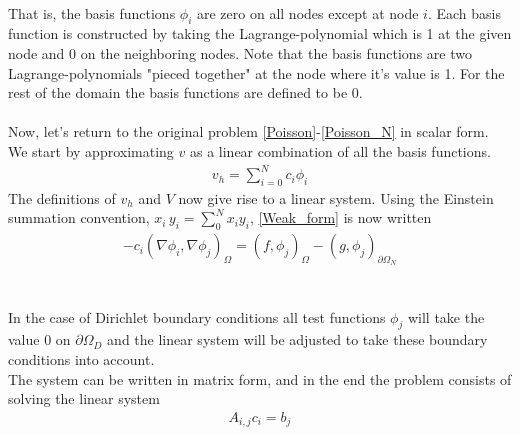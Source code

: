 \\
That is, the basis functions $\phi_i$ are zero on all nodes except at node $i$. Each basis function is constructed by taking the Lagrange-polynomial which is 1 at the given node and 0 on the neighboring nodes. Note that the basis functions are two Lagrange-polynomials "pieced together" at the node where it's value is 1. For the rest of the domain the basis functions are defined to be 0. \\ \\

Now, let's return to the original problem \eqref{Poisson}-\eqref{Poisson_N} in scalar form. We start by approximating $v$ as a linear combination of all the basis functions. 
\begin{align}
v_h = \sum_{i=0}^N c_i \phi_i \label{u_hsum}
\end{align}
The definitions of $v_h$ and $V$ now give rise to a linear system. Using the Einstein summation convention, $x_i\,y_i = \sum_0^N x_i y_i $, \eqref{Weak_form} is now written 
\begin{align}
-c_i(\nabla \phi_i, \nabla \phi_j)_\Omega = (f,\phi_j)_\Omega - (g, \phi_j)_{\partial \Omega_N} \label{|linear_system}
\end{align}
\\
\\

In the case of Dirichlet boundary conditions all test functions $\phi_j$ will take the value 0 on $\partial \Omega_D$ and the linear system will be adjusted to take these boundary conditions into account. \\
The system can be written in matrix form, and in the end the problem consists of solving the linear system
\begin{align} A_{i,j}c_i = b_j \label{Matrix_1} \end{align}
\\
\\
